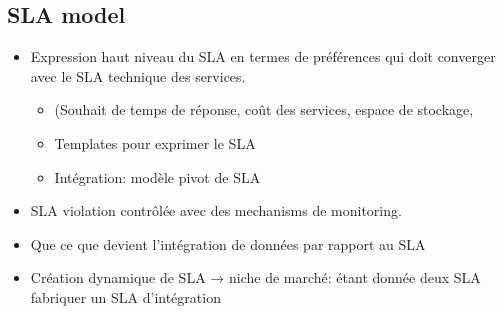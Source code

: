 \subsection{SLA model}
\label{sec:slaModel}

\begin{itemize}
\item Expression haut niveau du SLA en termes de préférences qui doit converger avec le SLA technique des services.
  \begin{itemize}
  \item (Souhait de temps de réponse, coût des services, espace de stockage,  
  \item Templates pour exprimer le SLA
  \item Intégration: modèle pivot de SLA
\end{itemize}

\item SLA violation contrôlée avec des mechanisms de monitoring.
\item Que ce que devient l’intégration de données par rapport au SLA
\item Création dynamique de SLA → niche de marché: étant donnée deux SLA fabriquer un SLA d’intégration
\end{itemize}


